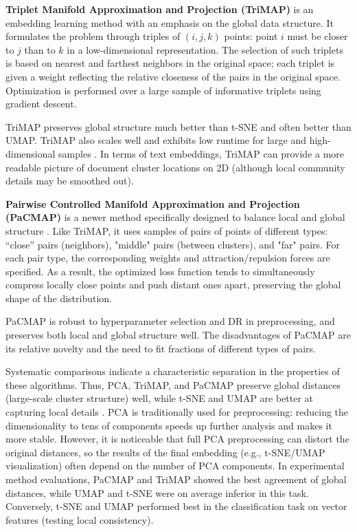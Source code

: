 \textbf{Triplet Manifold Approximation and Projection (TriMAP)} is an embedding learning method with an emphasis
on the global \parencite{TRIMAP2019} data structure. It formulates the problem through triples of $(i,j,k)$
points: point $i$ must be closer to $j$ than to $k$ in a low-dimensional representation. The selection
of such triplets is based on nearest and farthest neighbors in the original space; each triplet is given
a weight reflecting the relative closeness of the pairs in the original space. Optimization is performed over
a large sample of informative triplets using gradient descent.

TriMAP preserves global structure much better than t-SNE and often better than UMAP. TriMAP also scales well
and exhibits low runtime for large and high-dimensional samples \parencite{TRIMAP2019}. In terms of text embeddings,
TriMAP can provide a more readable picture of document cluster locations on 2D (although local community details
may be smoothed out).

\textbf{Pairwise Controlled Manifold Approximation and Projection (PaCMAP)} is a newer method specifically designed
to balance local and global structure \parencite{PACMAP2021}. Like TriMAP, it uses samples of pairs of points
of different types: “close” pairs (neighbors), "middle" pairs (between clusters), and "far" pairs. For each
pair type, the corresponding weights and attraction/repulsion forces are specified. As a result, the optimized
loss function tends to simultaneously compress locally close points and push distant ones apart, preserving
the global shape of the distribution.

PaCMAP is robust to hyperparameter selection and DR in preprocessing, and preserves both
local and global structure well. The disadvantages of PaCMAP are its relative novelty and the need to fit
fractions of different types of pairs.

Systematic comparisons indicate a characteristic separation in the properties of these algorithms. Thus, PCA,
TriMAP, and PaCMAP preserve global distances (large-scale cluster structure) well, while t-SNE and UMAP are better
at capturing local details \parencite{huang2022towards}. PCA is traditionally used for preprocessing: reducing
the dimensionality to tens of components speeds up further analysis and makes it more stable. However, it is
noticeable that full PCA preprocessing can distort the original distances, so the results of the final embedding
(e.g., t-SNE/UMAP visualization) often depend on the number of PCA components. In experimental method evaluations,
PaCMAP and TriMAP showed the best agreement of global distances, while UMAP and t-SNE were on average inferior
in this task. Conversely, t-SNE and UMAP performed best in the classification task on vector features (testing
local consistency).

